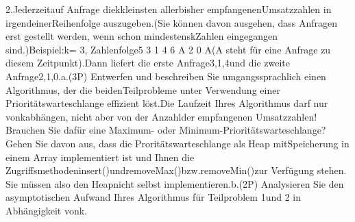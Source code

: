 \documentclass{article}
\begin{document}
2.Jederzeitauf Anfrage diekkleinsten allerbisher empfangenenUmsatzzahlen in irgendeinerReihenfolge auszugeben.(Sie können davon ausgehen, dass Anfragen erst gestellt werden, wenn schon mindestenskZahlen eingegangen sind.)Beispiel:k= 3, Zahlenfolge5 3 1 4 6 A 2 0 A(A steht für eine Anfrage zu diesem Zeitpunkt).Dann liefert die erste Anfrage3,1,4und die zweite Anfrage2,1,0.a.(3P) Entwerfen und beschreiben Sie umgangssprachlich einen Algorithmus, der die beidenTeilprobleme unter Verwendung einer Prioritätswarteschlange effizient löst.Die Laufzeit Ihres Algorithmus darf nur vonkabhängen, nicht aber von der Anzahlder empfangenen Umsatzzahlen! Brauchen Sie dafür eine Maximum- oder Minimum-Prioritätswarteschlange? Gehen Sie davon aus, dass die Proritätswarteschlange als Heap mitSpeicherung in einem Array implementiert ist und Ihnen die Zugriffsmethodeninsert()undremoveMax()bzw.removeMin()zur Verfügung stehen. Sie müssen also den Heapnicht selbst implementieren.b.(2P) Analysieren Sie den asymptotischen Aufwand Ihres Algorithmus für Teilproblem 1und 2 in Abhängigkeit vonk.



\end{document}
